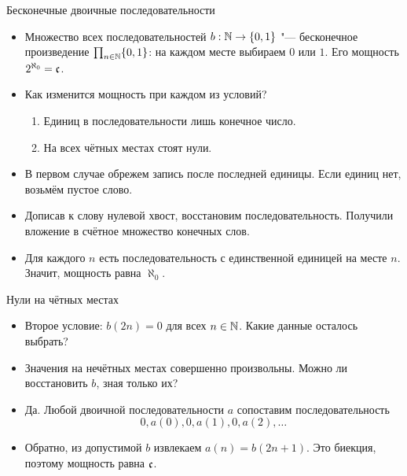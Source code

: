 \documentclass[10pt]{beamer}
\begin{document}
\begin{frame}{Бесконечные двоичные последовательности}
    \begin{itemize}
        \item Множество всех последовательностей $b:\mathbb{N}\to\{0,1\}$ "--- бесконечное произведение $\prod_{n\in\mathbb{N}}\{0,1\}$: на каждом месте выбираем $0$ или $1$. Его мощность $2^{\aleph_0}=\mathfrak{c}$.
        \item Как изменится мощность при каждом из условий?
        \begin{enumerate}
            \item Единиц в последовательности лишь конечное число.
            \item На всех чётных местах стоят нули.
        \end{enumerate}
        \item<2-> В первом случае обрежем запись после последней единицы. Если единиц нет, возьмём пустое слово.
        \item<3-> Дописав к слову нулевой хвост, восстановим последовательность. Получили вложение в счётное множество конечных слов.
        \item<4-> Для каждого $n$ есть последовательность с единственной единицей на месте $n$. Значит, мощность равна $\aleph_0$.
    \end{itemize}
\end{frame}

\begin{frame}{Нули на чётных местах}
    \begin{itemize}
        \item Второе условие: $b(2n)=0$ для всех $n\in\mathbb{N}$. Какие данные осталось выбрать?
        \item<2-> Значения на нечётных местах совершенно произвольны. Можно ли восстановить $b$, зная только их?
        \item<3-> Да. Любой двоичной последовательности $a$ сопоставим последовательность
        \[
           0,a(0),0,a(1),0,a(2),\ldots
        \]
        \item<4-> Обратно, из допустимой $b$ извлекаем $a(n)=b(2n+1)$. Это биекция, поэтому мощность равна $\mathfrak{c}$.
    \end{itemize}
\end{frame}
\end{document}
